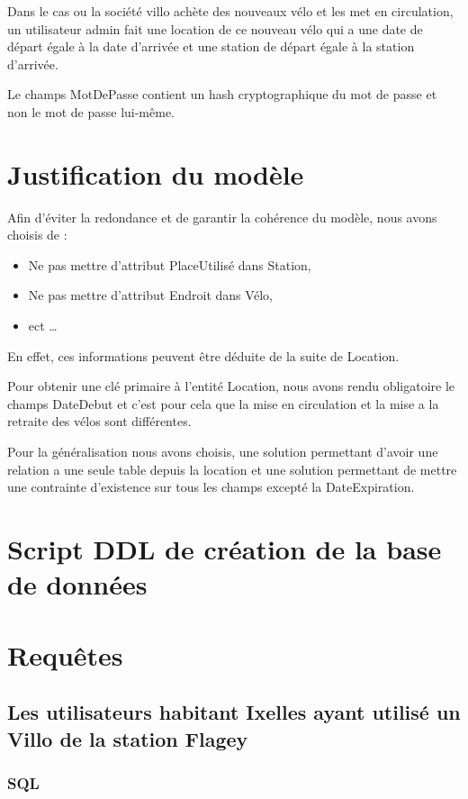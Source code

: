 \documentclass[a4paper,10pt]{article}
\begin{document}
Dans le cas ou la société villo achète des nouveaux vélo et les met en circulation, un utilisateur admin fait une location de ce nouveau vélo qui a une date de départ égale à la date d'arrivée et une station de départ égale à la station d'arrivée.

Le champs MotDePasse contient un hash cryptographique du mot de passe et non le mot de passe lui-m\^eme.

\section{Justification du modèle}

Afin d'éviter la redondance et de garantir la cohérence du modèle, nous avons choisis de :
\begin{itemize}
  \item Ne pas mettre d'attribut PlaceUtilisé dans Station,
  \item Ne pas mettre d'attribut Endroit dans Vélo,
  \item ect \ldots
\end{itemize}
En effet, ces informations peuvent être déduite de la suite de Location.

Pour obtenir une clé primaire à l'entité Location, nous avons rendu obligatoire le champs DateDebut et c'est pour cela que la mise en circulation et la mise a la retraite des vélos sont différentes.

Pour la généralisation nous avons choisis, une solution permettant d'avoir une relation a une seule table depuis la location et une solution permettant de mettre une contrainte d'existence sur tous les champs excepté la DateExpiration. 


\section{Script DDL de création de la base de données}


\section{Requêtes}

\subsection{Les utilisateurs habitant Ixelles ayant utilisé un Villo de la station Flagey}
\subsubsection{SQL}

\end{document}
